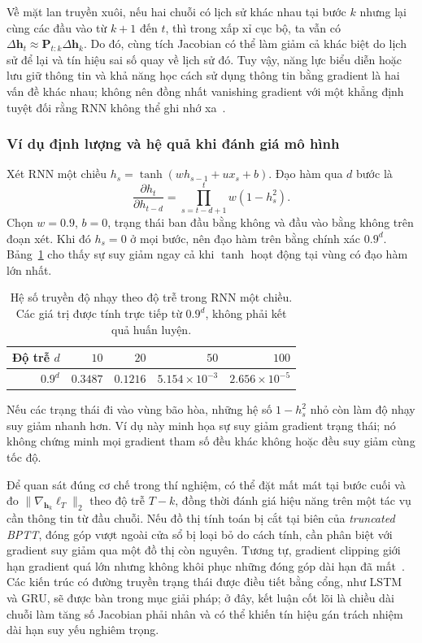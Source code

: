 \documentclass[12pt]{article}
\begin{document}
Về mặt lan truyền xuôi, nếu hai chuỗi có lịch sử khác nhau tại bước $k$ nhưng lại cùng các đầu vào từ $k+1$ đến $t$, thì trong xấp xỉ cục bộ,
ta vẫn có $\Delta\mathbf h_t\approx\mathbf P_{t:k}\Delta\mathbf h_k$.
Do đó, cùng tích Jacobian có thể làm giảm cả khác biệt do lịch sử để lại và tín hiệu sai số quay về lịch sử đó. Tuy vậy, năng lực biểu diễn hoặc lưu giữ thông tin và khả năng học cách sử dụng thông tin bằng gradient là hai vấn đề khác nhau; không nên đồng nhất vanishing gradient với một khẳng định tuyệt đối rằng RNN không thể ghi nhớ xa~\cite[\S10.7]{long-goodfellow2016}.

\subsubsection{Ví dụ định lượng và hệ quả khi đánh giá mô hình}
Xét RNN một chiều $h_s=\tanh(wh_{s-1}+ux_s+b)$. Đạo hàm qua $d$ bước là
\begin{equation}
 \frac{\partial h_t}{\partial h_{t-d}}
 =\prod_{s=t-d+1}^{t}w(1-h_s^2).
 \label{eq:long-rnn-scalar}
\end{equation}
Chọn $w=0.9$, $b=0$, trạng thái ban đầu bằng không và đầu vào bằng không trên đoạn xét. Khi đó $h_s=0$ ở mọi bước, nên đạo hàm trên bằng chính xác $0.9^d$. Bảng~\ref{tab:long-decay} cho thấy sự suy giảm ngay cả khi $\tanh$ hoạt động tại vùng có đạo hàm lớn nhất.
\begin{table}[htbp]
 \centering
 \caption{Hệ số truyền độ nhạy theo độ trễ trong RNN một chiều. Các giá trị được tính trực tiếp từ $0.9^d$, không phải kết quả huấn luyện.}
 \label{tab:long-decay}
 \begin{tabular}{@{}rrrrr@{}}
 \toprule
 Độ trễ $d$ & $10$ & $20$ & $50$ & $100$ \\
 \midrule
 $0.9^d$ & $0.3487$ & $0.1216$ & $5.154\times10^{-3}$ & $2.656\times10^{-5}$ \\
 \bottomrule
 \end{tabular}
\end{table}
Nếu các trạng thái đi vào vùng bão hòa, những hệ số $1-h_s^2$ nhỏ còn làm độ nhạy suy giảm nhanh hơn. Ví dụ này minh họa sự suy giảm gradient trạng thái; nó không chứng minh mọi gradient tham số đều khác không hoặc đều suy giảm cùng tốc độ.

Để quan sát đúng cơ chế trong thí nghiệm, có thể đặt mất mát tại bước cuối và đo $\|\nabla_{\mathbf h_k}\ell_T\|_2$ theo độ trễ $T-k$, đồng thời đánh giá hiệu năng trên một tác vụ cần thông tin từ đầu chuỗi. Nếu đồ thị tính toán bị cắt tại biên của \textit{truncated BPTT}, đóng góp vượt ngoài cửa sổ bị loại bỏ do cách tính, cần phân biệt với gradient suy giảm qua một đồ thị còn nguyên. Tương tự, gradient clipping giới hạn gradient quá lớn nhưng không khôi phục những đóng góp dài hạn đã mất~\cite[\S10.11.1]{long-goodfellow2016}. Các kiến trúc có đường truyền trạng thái được điều tiết bằng cổng, như LSTM và GRU, sẽ được bàn trong mục giải pháp; ở đây, kết luận cốt lõi là chiều dài chuỗi làm tăng số Jacobian phải nhân và có thể khiến tín hiệu gán trách nhiệm dài hạn suy yếu nghiêm trọng.
\end{document}
